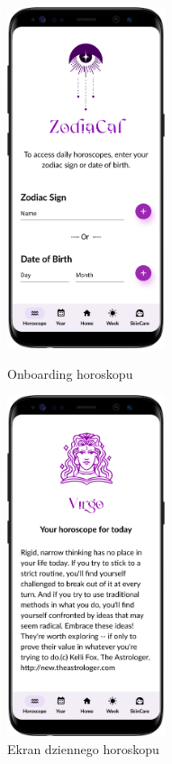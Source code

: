 \begin{figure}[t]
	\begin{minipage}{0.4\textwidth}
		\centering
		\includegraphics[height=10cm, keepaspectratio]{images/interfejs_figma/Horoscope-onboarding}
		\caption{Onboarding horoskopu}
		\label{fig:Onboarding}
	\end{minipage}
	\hfill
	\begin{minipage}{0.4\textwidth}
		\centering
		\includegraphics[height=10cm,           keepaspectratio]{images/interfejs_figma/Horoscope}
		\caption{Ekran dziennego horoskopu}
		\label{fig:Horoscope}
	\end{minipage}
\end{figure}

